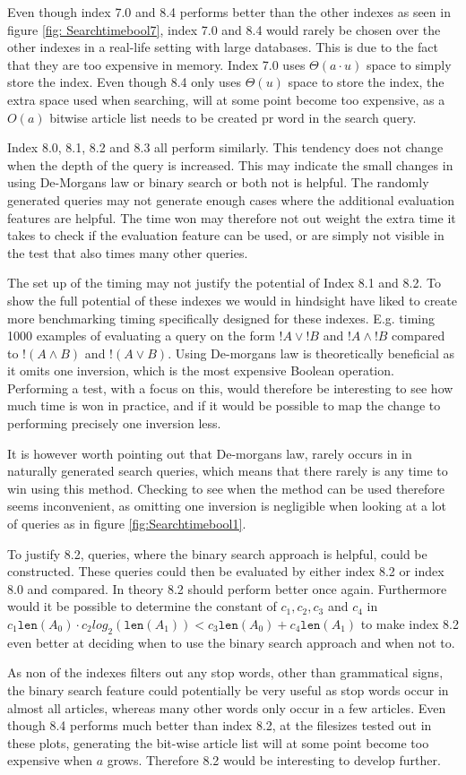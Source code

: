 Even though index 7.0 and 8.4 performs better than the other indexes as seen in figure \ref{fig: Searchtimebool7}, index 7.0 and 8.4 would rarely be chosen over the other indexes in a real-life setting with large databases. This is due to the fact that they are too expensive in memory. Index 7.0 uses $\Theta(a\cdot u)$ space to simply store the index. Even though 8.4 only uses $\Theta(u)$ space to store the index, the extra space used when searching, will at some point become too expensive, as a $O(a)$ bitwise article list needs to be created pr word in the search query.

Index 8.0, 8.1, 8.2 and 8.3 all perform similarly. This tendency does not change when the depth of the query is increased. This may indicate the small changes in using De-Morgans law or binary search or both not is helpful. The randomly generated queries may not generate enough cases where the additional evaluation features are helpful. The time won may therefore not out weight the extra time it takes to check if the evaluation feature can be used, or are simply not visible in the test that also times many other queries. 

The set up of the timing may not justify the potential of Index 8.1 and 8.2. To show the full potential of these indexes we would in hindsight have liked to create more benchmarking timing specifically designed for these indexes. E.g. timing 1000 examples of evaluating a query on the form $!A \vee ! B$ and $!A \wedge ! B$  compared to $!(A \wedge B)$ and $!(A \vee B)$. Using De-morgans law is theoretically beneficial as it omits one inversion, which is the most expensive Boolean operation. Performing a test, with a focus on this, would therefore be interesting to see how much time is won in practice, and if it would be possible to map the change to performing precisely one inversion less.

It is however worth pointing out that De-morgans law, rarely occurs in in naturally generated search queries, which means that there rarely is any time to win using this method. Checking to see when the method can be used therefore seems inconvenient, as omitting one inversion is negligible when looking at a lot of queries as in figure \ref{fig:Searchtimebool1}.

To justify 8.2, queries, where the binary search approach is helpful, could be constructed. These queries could then be evaluated by either index 8.2 or index 8.0 and compared. In theory 8.2 should perform better once again. Furthermore would it be possible to determine the constant of $c_1,c_2,c_3$ and $c_4$ in $c_1\texttt{len}(A_0) \cdot c_2 log_2(\texttt{len}(A_1)) < c_3 \texttt{len}(A_0) + c_4 \texttt{len}(A_1)$ to make index 8.2 even better at deciding when to use the binary search approach and when not to.

As non of the indexes filters out any stop words, other than grammatical signs, the binary search feature could potentially be very useful as stop words occur in almost all articles, whereas many other words only occur in a few articles. Even though 8.4 performs much better than index 8.2, at the filesizes tested out in these plots, generating the bit-wise article list will at some point become too expensive when $a$ grows. Therefore 8.2 would be interesting to develop further.
